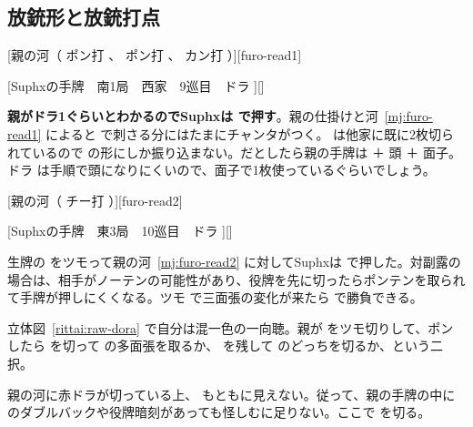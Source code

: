 \documentclass[../nankiru_main.tex]{subfiles}
\begin{document}

\subsection{放銃形と放銃打点}

[親の河（ ポン打 、 ポン打 、 カン打 ）][furo-read1]

[Suphxの手牌　南1局　西家　9巡目　ドラ ][]

\textbf{親がドラ1ぐらいとわかるのでSuphxは  で押す}\citep[][pp.~38--39]{suphx}。親の仕掛けと河~\ref{mj:furo-read1} によると  で刺さる分にはたまにチャンタがつく。 は他家に既に2枚切られているので  の形にしか振り込まない。だとしたら親の手牌は  ＋ 頭 ＋ 面子。ドラ  は手順で頭になりにくいので、面子で1枚使っているぐらいでしょう。

[親の河（ チー打 ）][furo-read2]

[Suphxの手牌　東3局　10巡目　ドラ ][]

生牌の  をツモって親の河~\ref{mj:furo-read2} に対してSuphxは  で押した\citep[][pp.~42--43]{suphx}。対副露の場合は、相手がノーテンの可能性があり、役牌を先に切ったらポンテンを取られて手牌が押しにくくなる。ツモ  で三面張の変化が来たら  で勝負できる。

\begin{rittai}[h]
  \centering
  
  
  \caption{親の  ポンするなら生牌のドラ  を切るか}
  \label{rittai:raw-dora}
\end{rittai}

立体図~\ref{rittai:raw-dora} で自分は混一色の一向聴。親が  をツモ切りして、ポンしたら  を切って  の多面張を取るか、 を残して  のどっちを切るか、という二択。

親の河に赤ドラが切っている上、 もともに見えない。従って、親の手牌の中に  のダブルバックや役牌暗刻があっても怪しむに足りない。ここで  を切る\citep[][pp.116~119]{doi}。
\end{document}
